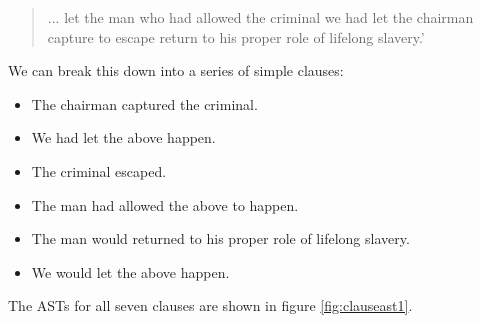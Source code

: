 \documentclass{book}
\begin{document}
\begin{quotation}
    ... let the man who had allowed the criminal we had let the chairman capture to escape return to his proper role of lifelong slavery.'
\end{quotation}

We can break this down into a series of simple clauses:

\begin{itemize}
    \item The chairman captured the criminal.
    \item We had let the above happen.
    \item The criminal escaped.
    \item The man had allowed the above to happen.
    \item The man would returned to his proper role of lifelong slavery.
    \item We would let the above happen.
\end{itemize}

The ASTs for all seven clauses are shown in figure \ref{fig:clauseast1}.

\end{document}
